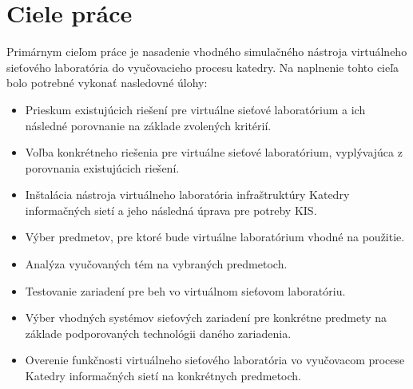 \chapter{Ciele práce}

Primárnym cieľom práce je nasadenie vhodného simulačného nástroja virtuálneho sieťového laboratória do vyučovacieho procesu katedry. Na naplnenie tohto cieľa bolo potrebné vykonať nasledovné úlohy:

\begin{itemize}[noitemsep]
    \item Prieskum existujúcich riešení pre virtuálne sieťové laboratórium a ich následné porovnanie na základe zvolených kritérií.
    \item Voľba konkrétneho riešenia pre virtuálne sieťové laboratórium, vyplývajúca z porovnania existujúcich riešení.
    \item Inštalácia nástroja virtuálneho laboratória infraštruktúry Katedry informačných sietí a jeho následná úprava pre potreby KIS.
    \item Výber predmetov, pre ktoré bude virtuálne laboratórium vhodné na použitie.
    \item Analýza vyučovaných tém na vybraných predmetoch.
    \item Testovanie zariadení pre beh vo virtuálnom sieťovom laboratóriu.
    \item Výber vhodných systémov sieťových zariadení pre konkrétne predmety na základe podporovaných technológii daného zariadenia.
    \item Overenie funkčnosti virtuálneho sieťového laboratória vo vyučovacom procese Katedry informačných sietí na konkrétnych predmetoch.
\end{itemize}